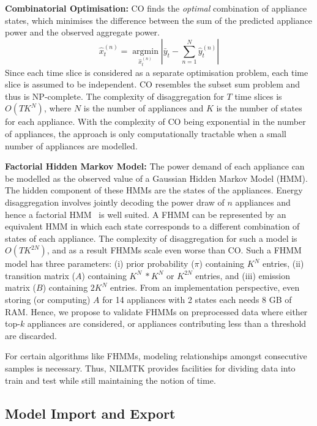 \documentclass{sig-alternate}
\newcommand{\bluecolor}[1]{\textcolor{blue}{#1}}
\begin{document}
\textbf{Combinatorial Optimisation:}
CO finds the \textit{optimal} combination of appliance states, which minimises the difference between the sum of the predicted appliance power and the observed aggregate power. 
\begin{equation}
\hat{x}^{(n)}_t=\operatorname*{arg min}_{\hat{x}^{(n)}_t}\left|\bar{y}_t-\sum\limits_{n=1}^{N}\hat{y}^{(n)}_t\right|
\end{equation}
Since each time slice is considered as a separate optimisation problem, each time slice is assumed to be independent.
CO resembles the subset sum problem and thus is NP-complete. The complexity of disaggregation for $T$ time slices is $O(TK^N)$, where $N$ is the number of appliances and $K$ is the number of states for each appliance. With the complexity of CO being exponential in the number of appliances, the approach is only computationally tractable when a small number of appliances are modelled.

\textbf{Factorial Hidden Markov Model:} The power demand of each appliance can be modelled as the observed value of a Gaussian Hidden Markov Model (HMM). The hidden component of these HMMs are the states of the appliances. Energy disaggregation involves jointly decoding the power draw of $n$ appliances and hence a factorial HMM~\cite{fhmm} is well suited. A FHMM can be represented by an equivalent HMM in which each state corresponds to a different combination of states of each appliance. The complexity of disaggregation for such a model is $O(TK^{2N})$, and as a result FHMMs scale even worse than CO. Such a FHMM model has three parameters: (i) prior probability ($\pi$) containing $K^N$ entries, (ii) transition matrix ($A$) containing $K^N~*K^N$ or $K^{2N}$ entries, and (iii) emission matrix ($B$) containing $2K^N$ entries. From an implementation perspective, even storing (or computing) $A$ for 14 appliances with 2 states each needs 8 GB of RAM. Hence, we propose to validate FHMMs on preprocessed data where either top-$k$ appliances are considered, or appliances contributing less than a threshold are discarded.

For certain algorithms like FHMMs, modeling relationships amongst consecutive samples is necessary. Thus, NILMTK provides facilities for dividing data into train and test while still maintaining the notion of time.
\subsection{Model Import and Export}
\end{document}
